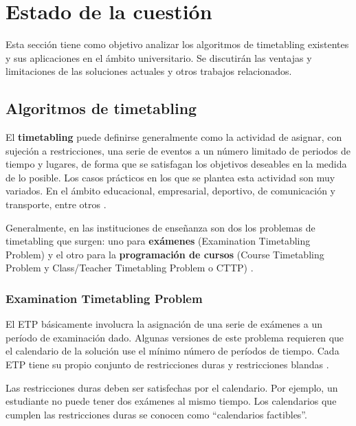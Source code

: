 \chapter{Estado de la cuestión}

Esta sección tiene como objetivo analizar los algoritmos de timetabling existentes y sus aplicaciones en el ámbito universitario. Se discutirán las ventajas y limitaciones de las soluciones actuales y otros trabajos relacionados.\newpage

\section{Algoritmos de timetabling}

El \textbf{timetabling} puede definirse generalmente como la actividad de asignar, con sujeción a restricciones, una serie de eventos a un número limitado de periodos de tiempo y lugares, de forma que se satisfagan los objetivos deseables en la medida de lo posible. Los casos prácticos en los que se plantea esta actividad son muy variados. En el ámbito educacional, empresarial, deportivo, de comunicación y transporte, entre otros \cite{hybrid-timetabling}.\newline

Generalmente, en las instituciones de enseñanza son dos los problemas de timetabling que surgen: uno para \textbf{exámenes} (Examination Timetabling Problem) y el otro para la \textbf{programación de cursos} (Course Timetabling Problem y Class/Teacher Timetabling Problem o CTTP) \cite{carter}.\newline

\subsection{Examination Timetabling Problem}
El ETP básicamente involucra la asignación de una serie de exámenes a un período de examinación dado. Algunas versiones de este problema requieren que el calendario de la solución use el mínimo número de períodos de tiempo. Cada ETP tiene su propio conjunto de restricciones duras y restricciones blandas \cite{AutomatedTimetabling,NAJIAZIMI2005705}.\newline

Las restricciones duras deben ser satisfechas por el calendario. Por ejemplo, un estudiante no puede tener dos exámenes al mismo tiempo. Los calendarios que cumplen las restricciones duras se conocen como ``calendarios factibles''.\newline

